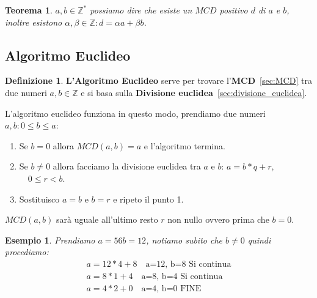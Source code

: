 \documentclass{article}
\newtheorem{exmp}{Esempio}[section]
\newtheorem{theorem}{Teorema}[section]
\theoremstyle{definition}
\newtheorem{definition}{Definizione}[section]
\begin{document}
\begin{tcolorbox}
        \begin{theorem}
        $ a,b \in \mathbb{Z}^*$ possiamo dire che esiste un $ MCD $ positivo $ d $ di $ a $ e $ b $, inoltre esistono $ \alpha, \beta \in \mathbb{Z} : d = \alpha a + \beta b$.                
        \end{theorem}
\end{tcolorbox}



\subsection{Algoritmo Euclideo}\label{sec:algoritmo_euclideo}
\begin{definition}
        \textbf{L'Algoritmo Euclideo} serve per trovare l'\textbf{MCD}~\ref{sec:MCD} tra due numeri $ a,b \in \mathbb{Z} $ e si basa sulla \textbf{Divisione euclidea}~\ref{sec:divisione_euclidea}.
\end{definition}
L'algoritmo euclideo funziona in questo modo, prendiamo due numeri $ a,b : 0 \le b \le a $:
\begin{enumerate}
        \item Se $ b = 0 $ allora $ MCD(a,b) = a $ e l'algoritmo termina.
        \item Se $ b \not = 0 $ allora facciamo la divisione euclidea tra $ a $ e $ b $:\newline
                $ a = b * q + r $, $\quad  0 \le r < b $. 
        \item Sostituisco $ a=b $ e $ b=r $ e ripeto il punto 1.  
\end{enumerate}
$ MCD(a,b) $ sarà uguale all'ultimo resto $ r $ non nullo ovvero prima che $ b=0 $.

\begin{exmp}\label{ex:algorimto_euclideo}
        Prendiamo $ a=56 b=12 $, notiamo subito che $ b \not = 0 $ quindi procediamo:
        \begin{align*}
                a = 12 * 4 + 8 \quad \mbox{a=12, b=8 Si continua} \\ 
                a = 8 * 1 + 4 \quad \mbox{a=8, b=4  Si continua} \\ 
                a = 4 * 2 + 0 \quad \mbox{a=4, b=0  FINE}  
        \end{align*}
\end{exmp}
\end{document}
